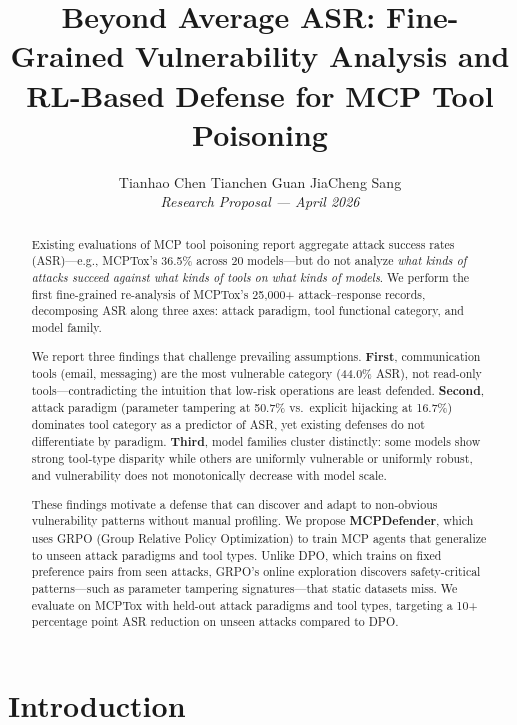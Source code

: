 \documentclass[11pt,a4paper]{article}
\title{\textbf{Beyond Average ASR: Fine-Grained Vulnerability Analysis and RL-Based Defense for MCP Tool Poisoning}}
\author{
Tianhao Chen \quad Tianchen Guan \quad JiaCheng Sang \\
\textit{Research Proposal --- April 2026}
}
\date{}
\begin{document}
\maketitle

\begin{abstract}
Existing evaluations of MCP tool poisoning report aggregate attack success rates (ASR)---e.g., MCPTox's 36.5\% across 20 models---but do not analyze \emph{what kinds of attacks succeed against what kinds of tools on what kinds of models}.
We perform the first fine-grained re-analysis of MCPTox's 25,000+ attack--response records, decomposing ASR along three axes: attack paradigm, tool functional category, and model family.

We report three findings that challenge prevailing assumptions.
\textbf{First}, communication tools (email, messaging) are the most vulnerable category (44.0\% ASR), not read-only tools---contradicting the intuition that low-risk operations are least defended.
\textbf{Second}, attack paradigm (parameter tampering at 50.7\% vs.\ explicit hijacking at 16.7\%) dominates tool category as a predictor of ASR, yet existing defenses do not differentiate by paradigm.
\textbf{Third}, model families cluster distinctly: some models show strong tool-type disparity while others are uniformly vulnerable or uniformly robust, and vulnerability does not monotonically decrease with model scale.

These findings motivate a defense that can discover and adapt to non-obvious vulnerability patterns without manual profiling.
We propose \textbf{MCPDefender}, which uses GRPO (Group Relative Policy Optimization) to train MCP agents that generalize to unseen attack paradigms and tool types.
Unlike DPO, which trains on fixed preference pairs from seen attacks, GRPO's online exploration discovers safety-critical patterns---such as parameter tampering signatures---that static datasets miss.
We evaluate on MCPTox with held-out attack paradigms and tool types, targeting a 10+ percentage point ASR reduction on unseen attacks compared to DPO.
\end{abstract}


\section{Introduction}
\label{sec:intro}
\end{document}

